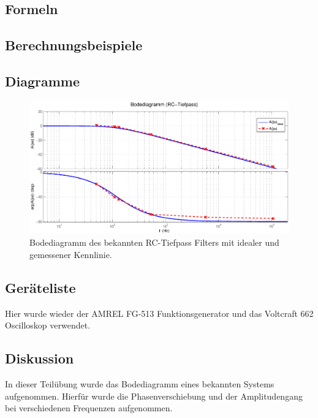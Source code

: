 \documentclass[12pt,a4paper,ngerman]{article}
\begin{document}
\subsection{Formeln}

\subsection{Berechnungsbeispiele}

\subsection{Diagramme}
\begin{figure}[H]
\centering
\includegraphics[width=1.1\textwidth]{figures/bode_rc.eps} 
\caption{Bodediagramm des bekannten RC-Tiefpass Filters mit idealer und gemessener Kennlinie.}
\label{fig:bode_bek}
\end{figure}


\subsection{Geräteliste}
Hier wurde wieder der AMREL FG-513 Funktionsgenerator und das Voltcraft 662 Oscilloskop verwendet.

\subsection{Diskussion}
In dieser Teilübung wurde das Bodediagramm eines bekannten Systems aufgenommen. Hierfür wurde die Phasenverschiebung und der Amplitudengang bei verschiedenen Frequenzen aufgenommen. 



 



   
\end{document}
